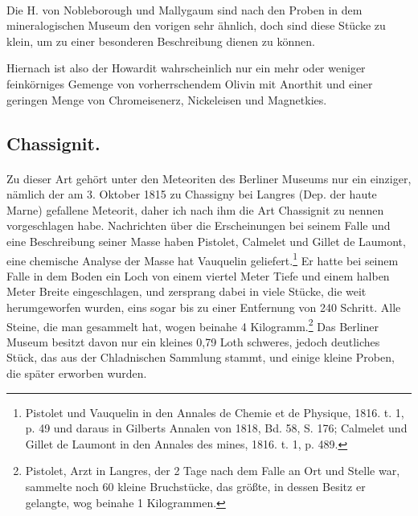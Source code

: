 \documentclass[a4paper, 11pt, oneside]{article}
\begin{document}
\paragraph{}
Die H. von Nobleborough und Mallygaum sind nach den Proben in dem mineralogischen Museum den vorigen sehr ähnlich, doch sind diese Stücke zu klein, um zu einer besonderen Beschreibung dienen zu können.

Hiernach ist also der Howardit wahrscheinlich nur ein mehr oder weniger feinkörniges Gemenge von vorherrschendem Olivin mit Anorthit und einer geringen Menge von Chromeisenerz, Nickeleisen und Magnetkies.
\subsection{Chassignit.}
\paragraph{}
Zu dieser Art gehört unter den Meteoriten des Berliner Museums nur ein einziger, nämlich der am 3. Oktober 1815 zu Chassigny bei Langres (Dep. der haute Marne) gefallene Meteorit, daher ich nach ihm die Art Chassignit zu nennen vorgeschlagen habe. Nachrichten über die Erscheinungen bei seinem Falle und eine Beschreibung seiner Masse haben Pistolet, Calmelet und Gillet de Laumont, eine chemische Analyse der Masse hat Vauquelin geliefert.\footnote{Pistolet und Vauquelin in den Annales de Chemie et de Physique, 1816. t. 1, p. 49 und daraus in Gilberts Annalen von 1818, Bd. 58, S. 176; Calmelet und Gillet de Laumont in den Annales des mines, 1816. t. 1, p. 489.} Er hatte bei seinem Falle in dem Boden ein Loch von einem viertel Meter Tiefe und einem halben Meter Breite eingeschlagen, und zersprang dabei in viele Stücke, die weit herumgeworfen wurden, eins sogar bis zu einer Entfernung von 240 Schritt. Alle Steine, die man gesammelt hat, wogen beinahe 4 Kilogramm.\footnote{Pistolet, Arzt in Langres, der 2 Tage nach dem Falle an Ort und Stelle war, sammelte noch 60 kleine Bruchstücke, das größte, in dessen Besitz er gelangte, wog beinahe 1 Kilogrammen.} Das Berliner Museum besitzt davon nur ein kleines 0,79 Loth schweres, jedoch deutliches Stück, das aus der Chladnischen Sammlung stammt, und einige kleine Proben, die später erworben wurden.
\end{document}
